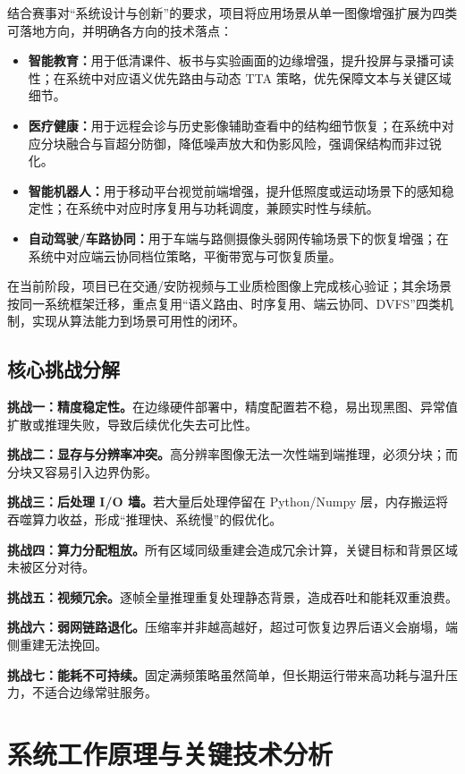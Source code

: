 \documentclass[12pt,a4paper]{ctexart}
\begin{document}
结合赛事对“系统设计与创新”的要求，项目将应用场景从单一图像增强扩展为四类可落地方向，并明确各方向的技术落点：
\begin{itemize}
  \item \textbf{智能教育：}用于低清课件、板书与实验画面的边缘增强，提升投屏与录播可读性；在系统中对应语义优先路由与动态 TTA 策略，优先保障文本与关键区域细节。
  \item \textbf{医疗健康：}用于远程会诊与历史影像辅助查看中的结构细节恢复；在系统中对应分块融合与盲超分防御，降低噪声放大和伪影风险，强调保结构而非过锐化。
  \item \textbf{智能机器人：}用于移动平台视觉前端增强，提升低照度或运动场景下的感知稳定性；在系统中对应时序复用与功耗调度，兼顾实时性与续航。
  \item \textbf{自动驾驶/车路协同：}用于车端与路侧摄像头弱网传输场景下的恢复增强；在系统中对应端云协同档位策略，平衡带宽与可恢复质量。
\end{itemize}

在当前阶段，项目已在交通/安防视频与工业质检图像上完成核心验证；其余场景按同一系统框架迁移，重点复用“语义路由、时序复用、端云协同、DVFS”四类机制，实现从算法能力到场景可用性的闭环。

\subsection{核心挑战分解}

\textbf{挑战一：精度稳定性。}在边缘硬件部署中，精度配置若不稳，易出现黑图、异常值扩散或推理失败，导致后续优化失去可比性。

\textbf{挑战二：显存与分辨率冲突。}高分辨率图像无法一次性端到端推理，必须分块；而分块又容易引入边界伪影。

\textbf{挑战三：后处理 I/O 墙。}若大量后处理停留在 Python/Numpy 层，内存搬运将吞噬算力收益，形成“推理快、系统慢”的假优化。

\textbf{挑战四：算力分配粗放。}所有区域同级重建会造成冗余计算，关键目标和背景区域未被区分对待。

\textbf{挑战五：视频冗余。}逐帧全量推理重复处理静态背景，造成吞吐和能耗双重浪费。

\textbf{挑战六：弱网链路退化。}压缩率并非越高越好，超过可恢复边界后语义会崩塌，端侧重建无法挽回。

\textbf{挑战七：能耗不可持续。}固定满频策略虽然简单，但长期运行带来高功耗与温升压力，不适合边缘常驻服务。

\section{系统工作原理与关键技术分析}
\end{document}
